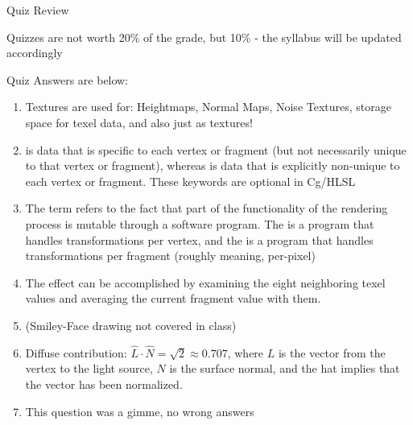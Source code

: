 \documentclass[11pt]{article}
\begin{document}
\maketitle

\begin{topic}{Quiz Review}
	\item Quizzes are not worth 20\% of the grade, but 10\% - the syllabus will be updated accordingly
	\item Quiz Answers are below:
	\begin{enumerate}
		\item Textures are used for: Heightmaps, Normal Maps, Noise Textures, storage space for texel data, and also just as textures!
		\item {} is data that is specific to each vertex or fragment (but not necessarily unique to that vertex or fragment), whereas  is data that is explicitly non-unique to each vertex or fragment. These keywords are optional in Cg/HLSL
		\item The term  refers to the fact that part of the functionality of the rendering process is mutable through a software program. The  is a program that handles transformations per vertex, and the  is a program that handles transformations per fragment (roughly meaning, per-pixel)
		\item The  effect can be accomplished by examining the eight neighboring texel values and averaging the current fragment value with them.
		\item (Smiley-Face drawing not covered in class)
		\item Diffuse contribution: $\hat{L} \cdot \hat{N} = \sqrt{2} \approx 0.707$, where $L$ is the vector from the vertex to the light source, $N$ is the surface normal, and the hat implies that the vector has been normalized.
		\item This question was a gimme, no wrong answers
	\end{enumerate}
\end{topic}
\end{document}
